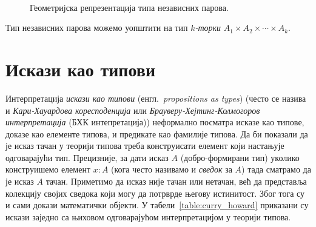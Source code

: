\documentclass[12pt,oneside]{memoir}
\begin{document}
\begin{figure}[!ht]
    \centering\
    \label{fig:geo_prod}
    \caption{Геометријска репрезентација типа независних парова.}
\end{figure}

Тип независних парова можемо уопштити на тип \emph{$k$-торки} $A_1 \times A_2 \times \cdots \times A_k$.

\section{Искази као типови}
\label{sec:prop-as-types}

Интерпретација \emph{искази као типови} (енгл.~\emph{propositions as types}) (често се назива и \emph{Кари-Хауардова коресподенција} или \emph{Брауверу-Хејтинг-Колмогоров интерпретација} (БХК интепретација)) неформално посматра исказе као типове, доказе као елементе типова, и предикате као фамилије типова. Да би показали да је исказ тачан у теорији типова треба конструисати елемент који настањује одговарајући тип. Прецизније, за дати исказ $A$ (добро-формирани тип) уколико конструишемо елемент $x : A$ (кога често називамо и \emph{сведок} за $A$) тада сматрамо да је исказ $A$ тачан. Приметимо да исказ није тачан или нетачан, већ да представља колекцију својих сведока који могу да потрврде његову истинитост. Због тога су и сами докази математички објекти. У табели~\ref{table:curry_howard} приказани су искази заједно са њиховом одговарајућом интерпретацијом у теорији типова.
\end{document}
